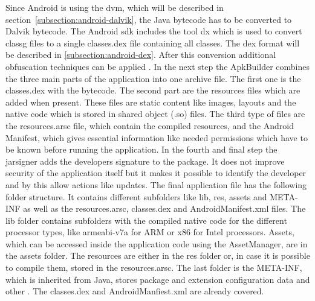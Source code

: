 Since Android is using the \gls{dvm}, which will be described in section~\ref{subsection:android-dalvik}, the Java bytecode has to be converted to Dalvik bytecode.
The Android \gls{sdk} includes the tool dx which is used to convert \gls{classg} files to a single classes.dex file containing all classes.
The \gls{dex} format will be described in \ref{subsection:android-dex}.
After this conversion additional obfuscation techniques can be applied \cite{dexProtector}.
\newline
In the next step the ApkBuilder combines the three main parts of the application into one archive file.
The first one is the classes.dex with the bytecode.
The second part are the resources files which are added when present.
These files are static content like images, layouts and the native code which is stored in shared object (.so) files.
The third type of files are the resources.arsc file, which contain the compiled resources, and the Android Manifest, which gives essential information like needed permissions which have to be known before running the application.
\newline
In the fourth and final step the jarsigner adds the developers signature to the package.
It does not improve security of the application itself but it makes it possible to identify the developer and by this allow actions like updates.
\newline
\newline
The final application file has the following folder structure.
It contains different subfolders like lib, res, assets and META-INF as well as the resources.arsc, classes.dex and AndroidManifest.xml files.
The lib folder contains subfolders with the compiled native code for the different processor types, like armeabi-v7a for ARM or x86 for Intel processors.
Assets, which can be accessed inside the application code using the AssetManager, are in the assets folder.
The resources are either in the res folder or, in case it is possible to compile them, stored in the resources.arsc.
The last folder is the META-INF, which is inherited from Java, stores package and extension configuration data and other \cite{metaJava}.
The classes.dex and AndroidManfiest.xml are already covered.
\cite{kovachevaMaster}\cite{ehringerDalvik}
